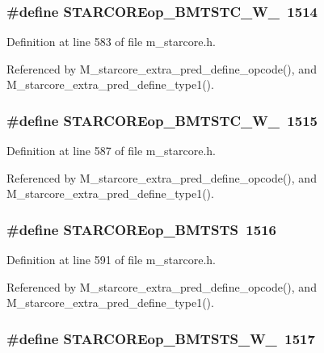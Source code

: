 \subsubsection{\setlength{\rightskip}{0pt plus 5cm}\#define STARCOREop\_\-BMTSTC\_\-W\_~1514}\label{m__starcore_8h_d81ae1f550beedde674c5fc6b94a98e1}




Definition at line 583 of file m\_\-starcore.h.

Referenced by M\_\-starcore\_\-extra\_\-pred\_\-define\_\-opcode(), and M\_\-starcore\_\-extra\_\-pred\_\-define\_\-type1().
\subsubsection{\setlength{\rightskip}{0pt plus 5cm}\#define STARCOREop\_\-BMTSTC\_\-W\_~1515}\label{m__starcore_8h_0a7f05950a45b60154c6ce18067d716c}




Definition at line 587 of file m\_\-starcore.h.

Referenced by M\_\-starcore\_\-extra\_\-pred\_\-define\_\-opcode(), and M\_\-starcore\_\-extra\_\-pred\_\-define\_\-type1().
\subsubsection{\setlength{\rightskip}{0pt plus 5cm}\#define STARCOREop\_\-BMTSTS~1516}\label{m__starcore_8h_67fcda01c0b18c98c5024f9ba4078d54}




Definition at line 591 of file m\_\-starcore.h.

Referenced by M\_\-starcore\_\-extra\_\-pred\_\-define\_\-opcode(), and M\_\-starcore\_\-extra\_\-pred\_\-define\_\-type1().
\subsubsection{\setlength{\rightskip}{0pt plus 5cm}\#define STARCOREop\_\-BMTSTS\_\-W\_~1517}\label{m__starcore_8h_da0f3f786b55efc1d36e96e8c0242593}




